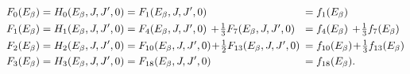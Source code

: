 \begin{align}
F_0(\Ee) & = H_0(\Ee, J, J^\prime, 0) = F_1(\Ee, J, J^\prime, 0) 
	\!\!\! 
	& = &\; f_1(\Ee) 
	\nonumber \\
F_1(\Ee) & = H_1(\Ee, J, J^\prime, 0) = \textstyle F_4(\Ee, J, J^\prime, 0) \,+\! \frac{1}{3}F_7(\Ee, J, J^\prime, 0) 
	\!\!\! 
	& = &\; \textstyle f_4(\Ee) \,+\! \frac{1}{3}f_7(\Ee) 
	\nonumber \\
F_2(\Ee) & = H_2(\Ee, J, J^\prime, 0) = \textstyle F_{10}(\Ee, J, J^\prime, 0) \!+\! \frac{1}{2}F_{13}(\Ee, J, J^\prime, 0) 
	\!\!\! 
	& = &\; \textstyle f_{10}(\Ee) \!+\! \frac{1}{3}f_{13}(\Ee) 
	\nonumber \\
F_3(\Ee) & = H_3(\Ee, J, J^\prime, 0) = F_{18}(\Ee, J, J^\prime, 0) 
	\!\!\!
	& = &\; f_{18}(\Ee) .
\label{eq:holstein_FHFf}
\end{align}
